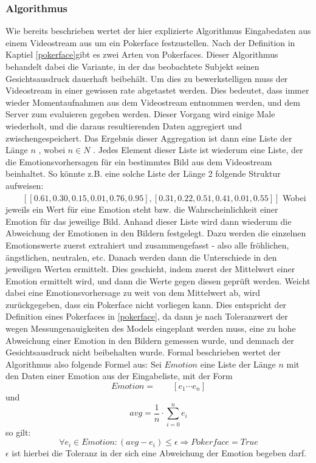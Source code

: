 \documentclass[12pt, a4paper]{scrbook}
\begin{document}
\subsubsection{Algorithmus}
Wie bereits beschrieben wertet der hier explizierte Algorithmus Eingabedaten aus einem Videostream aus um ein Pokerface festzustellen. Nach der Definition in Kaptiel 
\ref{pokerface}gibt es zwei Arten von Pokerfaces. Dieser Algorithmus behandelt dabei die Variante, in der das beobachtete Subjekt seinen Gesichtsausdruck dauerhaft beibehält. Um dies zu bewerkstelligen muss der Videostream in einer gewissen rate abgetastet werden. Dies bedeutet, dass immer wieder Momentaufnahmen aus dem Videostream entnommen werden, und dem Server zum evaluieren gegeben werden. Dieser Vorgang wird einige Male wiederholt, und die daraus resultierenden Daten aggregiert und zwischengespeichert. Das Ergebnis dieser Aggregation ist dann eine Liste der Länge 
$ n $  , wobei $ n \in N $
. Jedes Element dieser Liste ist wiederum eine Liste, der die Emotionsvorhersagen für ein bestimmtes Bild aus dem Videostream beinhaltet. So könnte z.B. eine solche Liste der Länge 2 folgende Struktur aufweisen: \newline
$ \qquad[ [0.61, 0.30, 0.15, 0.01, 0.76, 0.95] , [0.31, 0.22, 0.51, 0.41, 0.01, 0.55] ] $
Wobei jeweils ein Wert für eine Emotion steht bzw. die Wahrscheinlichkeit einer Emotion für das jeweilige Bild. Anhand dieser Liste wird dann wiederum die Abweichung der Emotionen in den Bildern festgelegt. Dazu werden die einzelnen Emotionswerte zuerst extrahiert und zusammengefasst - also alle fröhlichen, ängstlichen, neutralen, etc. Danach werden dann die Unterschiede in den jeweiligen Werten ermittelt.
Dies geschieht, indem zuerst der Mittelwert einer Emotion ermittelt wird, und dann die Werte gegen diesen geprüft werden. Weicht dabei eine Emotionsvorhersage zu weit von dem Mittelwert ab, wird zurückgegeben, dass ein Pokerface nicht vorliegen kann. Dies entspricht der Definition eines Pokerfaces in \ref{pokerface}, da dann je nach Toleranzwert der  wegen Messungenauigkeiten des Models eingeplant werden muss, eine zu hohe Abweichung einer Emotion in den Bildern gemessen wurde, und demnach der Gesichtsausdruck nicht beibehalten wurde.
Formal beschrieben wertet der Algorithmus also folgende Formel aus: \newline
Sei $ Emotion $ eine Liste der Länge $ n $ mit den Daten einer Emotion aus der Eingabeliste, mit der Form $$ Emotion = \qquad [e_{1} \cdots e_{n}] $$ 
und 
$$avg =\frac{1}{n} \cdot \sum_{i = 0}^{n} e_{i} $$
 so gilt:
\newline $$ \forall e_{i} \in Emotion : (avg - e_{i} ) \leq \epsilon \Rightarrow Pokerface = True $$
 $ \epsilon$ ist hierbei die Toleranz in der sich eine Abweichung der Emotion begeben darf.
\end{document}
